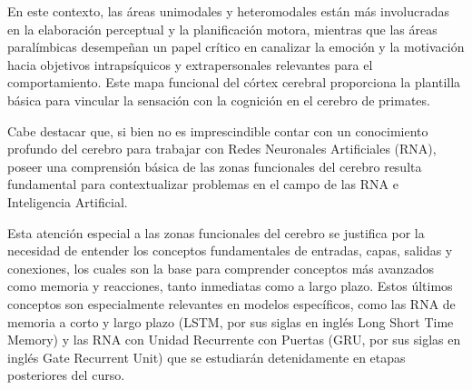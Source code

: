 En este contexto, las áreas unimodales y heteromodales están más involucradas en la elaboración perceptual y la planificación motora, mientras que las áreas paralímbicas desempeñan un papel crítico en canalizar la emoción y la motivación hacia objetivos intrapsíquicos y extrapersonales relevantes para el comportamiento. Este mapa funcional del córtex cerebral proporciona la plantilla básica para vincular la sensación con la cognición en el cerebro de primates.

Cabe destacar que, si bien no es imprescindible contar con un conocimiento profundo del cerebro para trabajar con Redes Neuronales Artificiales (RNA), poseer una comprensión básica de las zonas funcionales del cerebro resulta fundamental para contextualizar problemas en el campo de las RNA e Inteligencia Artificial.

Esta atención especial a las zonas funcionales del cerebro se justifica por la necesidad de entender los conceptos fundamentales de entradas, capas, salidas y conexiones, los cuales son la base para comprender conceptos más avanzados como memoria y reacciones, tanto inmediatas como a largo plazo. Estos últimos conceptos son especialmente relevantes en modelos específicos, como las RNA de memoria a corto y largo plazo (LSTM, por sus siglas en inglés Long Short Time Memory) y las RNA con Unidad Recurrente con Puertas (GRU, por sus siglas en inglés Gate Recurrent Unit)  que se estudiarán detenidamente en etapas posteriores del curso.







